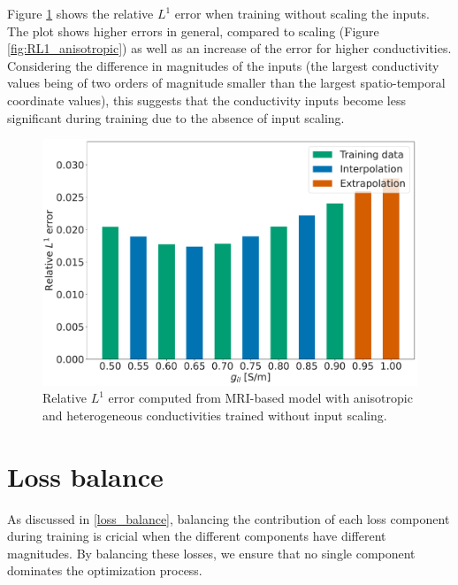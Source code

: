 Figure \ref{fig:RL1_anisotropic_no_scaling} shows the relative $L^1$ error when training without scaling the inputs. The plot shows higher errors in general, compared to scaling (Figure \ref{fig:RL1_anisotropic}) as well as an increase of the error for higher conductivities. Considering the difference in magnitudes of the inputs (the largest conductivity values being of two orders of magnitude smaller than the largest spatio-temporal coordinate values), this suggests that the conductivity inputs become less significant during training due to the absence of input scaling.
\begin{figure}[H]
  \centering
  \includegraphics[width=0.8\linewidth]{Figs/Anisotropic/L1_error_bar_plot_no_scaling.pdf}
  \caption{Relative $L^1$ error computed from MRI-based model with anisotropic and heterogeneous conductivities trained without input scaling.}
  \label{fig:RL1_anisotropic_no_scaling}
\end{figure}


\section{Loss balance}
As discussed in \ref{loss_balance}, balancing the contribution of each loss component during training is cricial when the different components have different magnitudes. By balancing these losses, we ensure that no single component dominates the optimization process.

